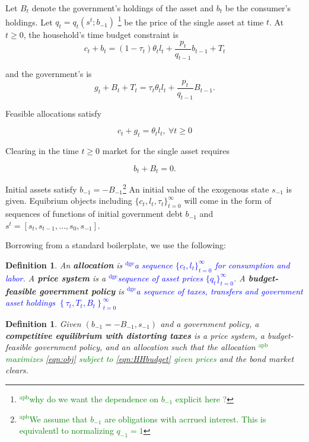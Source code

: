 \documentclass[12pt]{article}
\newcommand{\dge}[1]{\textcolor{blue}{$^{\textrm{dge}}${#1}}}
\newcommand{\apb}[1]{\textcolor{green}{$^{\textrm{apb}}${#1}}}
\newtheorem{definition}[theorem]{Definition}
\begin{document}
Let $B_t$ denote the government's holdings of the asset and $b_t$ be the consumer's holdings.
Let $q_t= q_t(s^t; b_{-1})$ \footnote{\apb{why do we want the dependence on $b_{-1}$ explicit here ?}} be the price of the single  asset at time $t$.
 At $t \geq 0$, the household's time budget constraint is
 \begin{equation}
 \label{eqn:HHbudget}
 c_{t}+b_{t}=\left( 1-\tau _{t}\right) \theta _{t}l_{t}+\frac{p_{t}}{q_{t-1}}b_{t-1}+T_{t}
 \end{equation}

 and the government's is
 \begin{equation}
 \label{eqn:Govbudget}
g_{t}+B_{t}+T_t=\tau _{t}\theta_{t}l_{t}+\frac{p_{t}}{q_{t-1}}B_{t-1}.
 \end{equation}


Feasible allocations satisfy

\begin{equation}
 \label{eqn:ResFeas}
 c_{t}+g_t = \theta _{t} l_{t}, \ \forall t \geq 0
 \end{equation}

 Clearing in the time $t \geq 0$ market for the single asset requires

 
\begin{equation}
 \label{eqn:bondmarket}
 b_{t}+B_{t}=0.
 \end{equation}

 Initial assets satisfy $b_{-1}=-B_{-1}$\footnote{\apb{We assume that $b_{-1}$ are obligations with acrrued interest. This is equivalentl to normalizing $q_{-1}=1$}} An initial value of the exogenous state  $s_{-1}$ is given.
Equibrium objects including $\{c_t, l_t, \tau_t\}_{t=0}^\infty$ will come in the form of sequences of functions of  initial government debt  $b_{-1}$ and  $s^t = [s_t, s_{t-1}, \ldots, s_0, s_{-1}]$.


Borrowing from a standard boilerplate, we use the following:

\begin{definition}
An \textbf{allocation} is \dge{a sequence $\{c_t,l_t\}_{t=0}^\infty$ for consumption and labor}. A \textbf{price system} is a \dge{sequence of asset prices $\{q_t\}_{t=0}^\infty$}.  A \textbf{budget-feasible government policy} is \dge{a sequence of taxes, transfers and government asset holdings $\left\{ \tau _{t},T_{t},B_t\right\} _{t=0}^{\infty }$}
\end{definition}

\begin{definition}
Given  $\left(b_{-1}=-B_{-1},s_{-1}\right) $ and a government policy,  a \textbf{competitive equilibrium
with distorting taxes} is a price system, a budget-feasible government policy, and an allocation such that
the allocation \apb{maximizes \eqref{eqn:obj} subject to \eqref{eqn:HHbudget} given prices} and the bond  market clears.
\end{definition}
\end{document}
